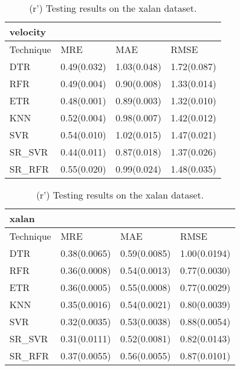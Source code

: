\documentclass[]{article}
\begin{document}
\begin{table}[h]
	\captionsetup[subtable]{labelformat=empty}
	\begin{adjustwidth}{-3.4cm}{}
		\begin{subtable}{9.5cm}
			\centering
			\caption{(q') Testing results on the velocity dataset.}
			\label{tab:xalan-wv}
			\begin{tabular}{llll}
				\hline
				velocity &             &              &             \\ \hline
				Technique    & MRE         & MAE          & RMSE        \\ \hline
				DTR          & 0.49(0.032) & 1.03(0.048)  & 1.72(0.087) \\
				RFR          & 0.49(0.004) & 0.90(0.008)  & 1.33(0.014) \\
				ETR          & 0.48(0.001) & 0.89(0.003)  & 1.32(0.010) \\
				KNN          & 0.52(0.004) & 0.98(0.007)  & 1.42(0.012) \\
				SVR          & 0.54(0.010) & 1.02(0.015)  & 1.47(0.021) \\
				SR\_SVR       & 0.44(0.011) & 0.87(0.018)  & 1.37(0.026) \\
				SR\_RFR       & 0.55(0.020) & 0.99(0.024)  & 1.48(0.035) \\ \hline
			\end{tabular}
		\end{subtable}
		\begin{subtable}{9.5cm}
			\centering
			\caption{(r') Testing results on the xalan dataset.}
			\label{tab:xerces-wv}
			\begin{tabular}{llll}
				\hline
				xalan &              &              &              \\ \hline
				Technique & MRE          & MAE          & RMSE         \\ \hline
				DTR       & 0.38(0.0065) & 0.59(0.0085) & 1.00(0.0194) \\
				RFR       & 0.36(0.0008) & 0.54(0.0013) & 0.77(0.0030) \\
				ETR       & 0.36(0.0005) & 0.55(0.0008) & 0.77(0.0029) \\
				KNN       & 0.35(0.0016) & 0.54(0.0021) & 0.80(0.0039) \\
				SVR       & 0.32(0.0035) & 0.53(0.0038) & 0.88(0.0054) \\
				SR\_SVR    & 0.31(0.0111) & 0.52(0.0081) & 0.82(0.0143) \\
				SR\_RFR    & 0.37(0.0055) & 0.56(0.0055) & 0.87(0.0101) \\ \hline
			\end{tabular}
		\end{subtable} 
	\end{adjustwidth}
\end{table}
\end{document}
